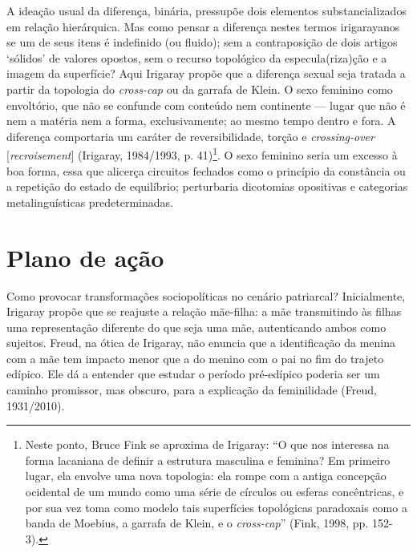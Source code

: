 A ideação usual da diferença, binária, pressupõe dois elementos
substancializados em relação hierárquica. Mas como pensar a diferença
nestes termos irigarayanos se um de seus itens é indefinido (ou fluido);
sem a contraposição de dois artigos `sólidos' de valores opostos, sem o
recurso topológico da especula(riza)ção e a imagem da superfície? Aqui
Irigaray propõe que a diferença sexual seja tratada a partir da
topologia do \emph{cross-cap} ou da garrafa de Klein. O sexo feminino
como envoltório, que não se confunde com conteúdo nem continente ---
lugar que não é nem a matéria nem a forma, exclusivamente; ao mesmo
tempo dentro e fora. A diferença comportaria um caráter de
reversibilidade, torção e \emph{crossing-over} {[}\emph{recroisement}{]}
(Irigaray, 1984/1993, p. 41)\footnote{Neste ponto, Bruce Fink se
  aproxima de Irigaray: ``O que nos interessa na forma lacaniana de
  definir a estrutura masculina e feminina? Em primeiro lugar, ela
  envolve uma nova topologia: ela rompe com a antiga concepção ocidental
  de um mundo como uma série de círculos ou esferas concêntricas, e por
  sua vez toma como modelo tais superfícies topológicas paradoxais como
  a banda de Moebius, a garrafa de Klein, e o \emph{cross-cap}'' (Fink,
  1998, pp. 152-3).}. O sexo feminino seria um excesso à boa forma, essa
que alicerça circuitos fechados como o princípio da constância ou a
repetição do estado de equilíbrio; perturbaria dicotomias opositivas e
categorias metalinguísticas predeterminadas.

\section{Plano de ação}

Como provocar transformações sociopolíticas no cenário patriarcal?
Inicialmente, Irigaray propõe que se reajuste a relação mãe-filha: a mãe
transmitindo às filhas uma representação diferente do que seja uma mãe,
autenticando ambos como sujeitos. Freud, na ótica de Irigaray, não
enuncia que a identificação da menina com a mãe tem impacto menor que a
do menino com o pai no fim do trajeto edípico. Ele dá a entender que
estudar o período pré-edípico poderia ser um caminho promissor, mas
obscuro, para a explicação da feminilidade (Freud, 1931/2010).

